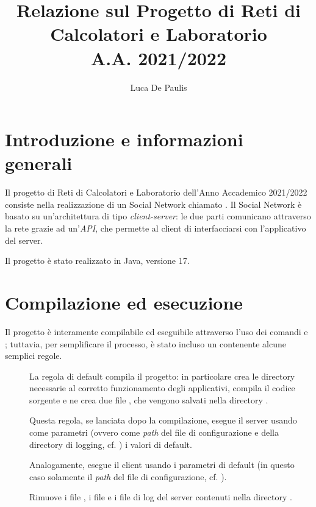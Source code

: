 \documentclass[
    oneside,
    10pt,
    language=italian,
    a4paper,
    article
]{notes}
\author{Luca De Paulis}
\title{Relazione sul Progetto di Reti di Calcolatori e Laboratorio \\
    \large A.A. 2021/2022 }
\begin{document}
\maketitle

\section{Introduzione e informazioni generali}
Il progetto di Reti di Calcolatori e Laboratorio dell'Anno Accademico 2021/2022
consiste nella realizzazione di un Social Network chiamato .
Il Social Network è basato su un'architettura di tipo \emph{client-server}:
le due parti comunicano attraverso la rete grazie ad un'\emph{API}, che permette
al client di interfacciarsi con l'applicativo del server.

Il progetto è stato realizzato in Java, versione 17.

\section{Compilazione ed esecuzione}
Il progetto è interamente compilabile ed eseguibile attraverso l'uso dei comandi
 e ; tuttavia, per semplificare il processo, è stato
incluso un  contenente alcune semplici regole.
\begin{description}
    \item[] La regola di default compila il progetto: in particolare 
        crea le directory necessarie al corretto funzionamento degli applicativi,
        compila il codice sorgente e ne crea due file , che vengono
        salvati nella directory .
    \item[] Questa regola, se lanciata dopo la
        compilazione, esegue il server usando come parametri (ovvero come 
        \emph{path} del file di configurazione e della directory di logging, 
        cf. ) i valori di default.
    \item[] Analogamente, esegue il client usando
        i parametri di default (in questo caso solamente il \emph{path} del
        file di configurazione, cf. ).  
    \item[] Rimuove i file , i file 
        e i file di log del server contenuti nella directory . 
\end{description}
\end{document}
